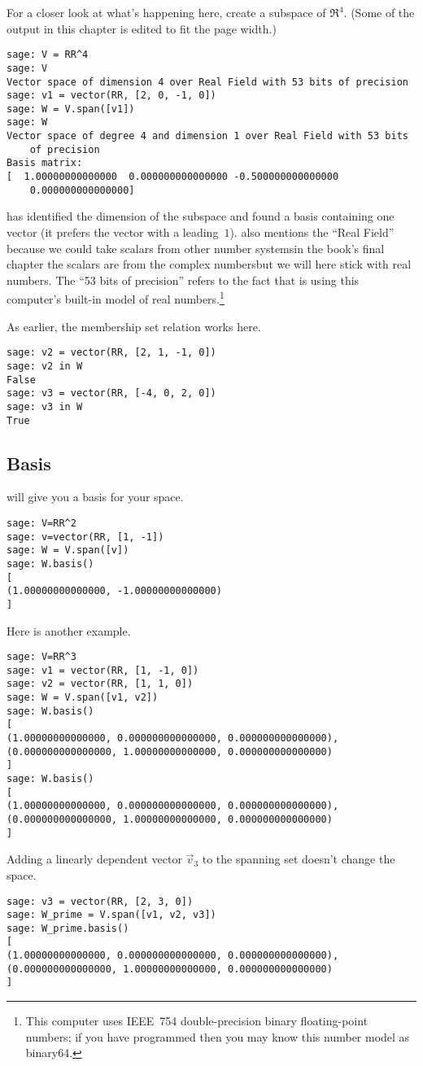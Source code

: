 For a closer look at what's happening here, create a subspace of $\Re^4$.
(Some of the output in this chapter is edited to fit the page width.)
\begin{lstlisting}
sage: V = RR^4
sage: V
Vector space of dimension 4 over Real Field with 53 bits of precision
sage: v1 = vector(RR, [2, 0, -1, 0])
sage: W = V.span([v1])
sage: W
Vector space of degree 4 and dimension 1 over Real Field with 53 bits 
    of precision
Basis matrix:
[  1.00000000000000  0.000000000000000 -0.500000000000000  
    0.000000000000000]
\end{lstlisting}
\Sage{} has identified the dimension of the subspace and found
a basis containing one vector (it prefers the vector with a leading~$1$).
\Sage{} also mentions the ``Real Field'' because we could take scalars
from other number systems\Dash in the book's final chapter the scalars are
from the complex numbers\Dash but we will here stick with real numbers.
The ``53 bits of precision'' refers to the fact that \Sage{} is using
this computer's built-in model of real numbers.\footnote{This computer uses
IEEE~754 double-precision binary floating-point numbers;  
if you have programmed then you may know this number model as binary64.}  

As earlier, the membership set relation works here.
\begin{lstlisting}
sage: v2 = vector(RR, [2, 1, -1, 0])
sage: v2 in W
False
sage: v3 = vector(RR, [-4, 0, 2, 0])
sage: v3 in W
True  
\end{lstlisting}



\subsection{Basis}
\Sage{} will give you a basis for your space.
\begin{lstlisting}
sage: V=RR^2
sage: v=vector(RR, [1, -1])
sage: W = V.span([v])     
sage: W.basis()
[
(1.00000000000000, -1.00000000000000)
]  
\end{lstlisting}

Here is another example.
\begin{lstlisting}
sage: V=RR^3               
sage: v1 = vector(RR, [1, -1, 0]) 
sage: v2 = vector(RR, [1, 1, 0]) 
sage: W = V.span([v1, v2])       
sage: W.basis()
[
(1.00000000000000, 0.000000000000000, 0.000000000000000),
(0.000000000000000, 1.00000000000000, 0.000000000000000)
]
sage: W.basis()
[
(1.00000000000000, 0.000000000000000, 0.000000000000000),
(0.000000000000000, 1.00000000000000, 0.000000000000000)
]
\end{lstlisting}
Adding a linearly dependent vector $\vec{v}_3$ to the spanning
set doesn't change the space.
\begin{lstlisting}
sage: v3 = vector(RR, [2, 3, 0])
sage: W_prime = V.span([v1, v2, v3])
sage: W_prime.basis()
[
(1.00000000000000, 0.000000000000000, 0.000000000000000),
(0.000000000000000, 1.00000000000000, 0.000000000000000)
]  
\end{lstlisting}

